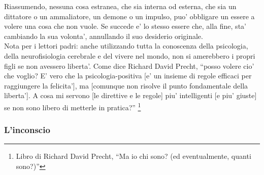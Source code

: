 Riassumendo, nessuna cosa estranea, che sia interna od esterna, che sia un dittatore o un ammaliatore, un demone o un impulso, puo' obbligare un essere a volere una cosa che non vuole. Se succede e' lo stesso essere che, alla fine, sta' cambiando la sua volonta', annullando il suo desiderio originale.\\

Nota per i lettori padri: anche utilizzando tutta la conoscenza della psicologia, della neurofisiologia cerebrale e del vivere nel mondo, non si amerebbero i propri figli se non avessero liberta'. Come dice Richard David Precht, ``posso volere cio' che voglio? E' vero che la psicologia-positiva [e' un insieme di regole efficaci per raggiungere la felicita'], ma [comunque non risolve il punto fondamentale della liberta']. A cosa mi servono [le direttive e le regole] piu' intelligenti [e piu' giuste] se non sono libero di metterle in pratica?'' \footnote{Libro di Richard David Precht, ``Ma io chi sono? (ed eventualmente, quanti sono?)''}

\subsubsection{L'inconscio}

